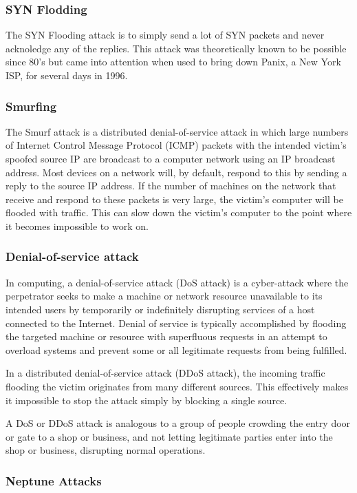 \documentclass[12pt]{article}
\theoremstyle{definition}
\begin{document}
			\subsubsection{SYN Flodding}
			The SYN Flooding attack is to simply send a lot of SYN packets and never acknoledge any of the replies. This attack was theoretically known to be possible since 80's but came into attention when used to bring down Panix, a New York ISP, for several days in 1996.
			
			\subsubsection{Smurfing}
			The Smurf attack is a distributed denial-of-service attack in which large numbers of Internet Control Message Protocol (ICMP) packets with the intended victim's spoofed source IP are broadcast to a computer network using an IP broadcast address. Most devices on a network will, by default, respond to this by sending a reply to the source IP address. If the number of machines on the network that receive and respond to these packets is very large, the victim's computer will be flooded with traffic. This can slow down the victim's computer to the point where it becomes impossible to work on.
			
			
			\subsubsection{Denial-of-service attack}
			In computing, a denial-of-service attack (DoS attack) is a cyber-attack where the perpetrator seeks to make a machine or network resource unavailable to its intended users by temporarily or indefinitely disrupting services of a host connected to the Internet. Denial of service is typically accomplished by flooding the targeted machine or resource with superfluous requests in an attempt to overload systems and prevent some or all legitimate requests from being fulfilled.
			
			In a distributed denial-of-service attack (DDoS attack), the incoming traffic flooding the victim originates from many different sources. This effectively makes it impossible to stop the attack simply by blocking a single source.
			
			A DoS or DDoS attack is analogous to a group of people crowding the entry door or gate to a shop or business, and not letting legitimate parties enter into the shop or business, disrupting normal operations.
			
			\subsubsection{Neptune Attacks}
			
\end{document}
